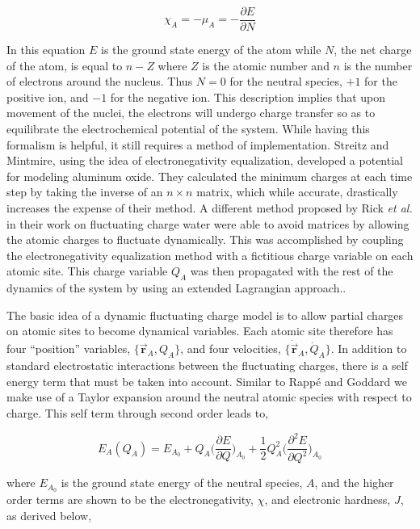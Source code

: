 \begin{equation}
\chi_A = -\mu_A = -\frac{\partial E}{\partial N}
\end{equation}

In this equation $E$ is the ground state energy of the atom while $N$, the net
charge of the atom, is equal to $n - Z$ where $Z$ is the atomic number and $n$
is the number of electrons around the nucleus. Thus $N = 0$ for the neutral
species, $+1$ for the positive ion, and $-1$ for the negative ion.  This
description implies that upon movement of the nuclei, the electrons will
undergo charge transfer so as to equilibrate the electrochemical potential of
the system. While having this formalism is helpful, it still requires a method
of implementation.  Streitz and Mintmire, using the idea of electronegativity
equalization, developed a potential for modeling aluminum oxide. They
calculated the minimum charges at each time step by taking the inverse of an
$n\times n$ matrix, which while accurate, drastically increases the expense of
their method.\citep{Streitz:1994mw} A different method proposed by Rick {\it et
al.} in their work on fluctuating charge water were able to avoid matrices by
allowing the atomic charges to fluctuate dynamically. This was accomplished by
coupling the electronegativity equalization method with a fictitious charge
variable on each atomic site. This charge variable $Q_A$ was then propagated
with the rest of the dynamics of the system by using an extended Lagrangian
approach.\citep{Rick:1994ss}.

The basic idea of a dynamic fluctuating charge model is to allow partial
charges on atomic sites to become dynamical variables.  Each atomic site
therefore has four ``position'' variables, $\{\vec{\mathbf{r}}_A, Q_A\}$, and
four velocities, $\{\dot{\vec{\mathbf{r}}}_A, \dot{Q}_A\}$.   In addition to
standard electrostatic interactions between the fluctuating charges, there is a
self energy term that must be taken into account. Similar to Rapp\'e and
Goddard\citep{Rappe:1991dq} we make use of a Taylor expansion around the
neutral atomic species with respect to charge.  This self term through second
order leads to,

\begin{equation} \label{eqn:selfenergy}
E_A(Q_A) = E_{A_0} + Q_A\bigg( \frac{\partial E}{\partial Q} \bigg )_{A_0} +
\frac{1}{2}Q_A^2 \bigg(\frac{\partial^2E}{\partial Q^2}\bigg)_{A_0}
\end{equation}

where $E_{A_0}$ is the ground state energy of the neutral species, $A$, and the
higher order terms are shown to be the electronegativity, $\chi$, and
electronic hardness, $J$, as derived below,

